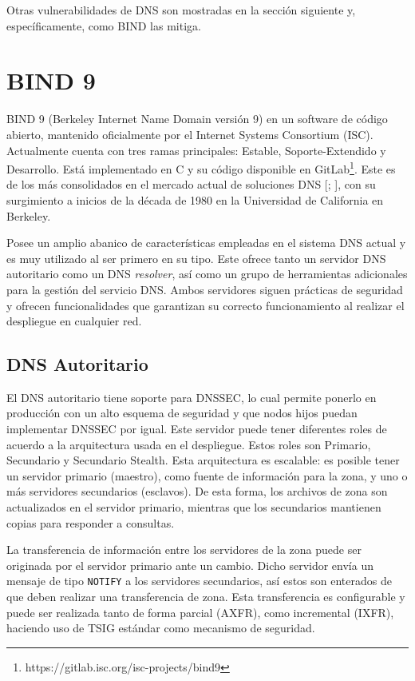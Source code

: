 Otras vulnerabilidades de DNS son mostradas en la sección siguiente y, específicamente, como BIND las mitiga.  

\section{BIND 9}

BIND 9 (Berkeley Internet Name Domain versión 9) en un software de código abierto, mantenido oficialmente por el Internet Systems Consortium (ISC). Actualmente cuenta con tres ramas principales: Estable, Soporte-Extendido y Desarrollo. Está implementado en C y su código disponible en GitLab\footnote{https://gitlab.isc.org/isc-projects/bind9}. Este es de los más consolidados en el mercado actual de soluciones DNS [\cite{dns-survey}; \cite{bind-usage}], con su surgimiento a inicios de la década de 1980 en la Universidad de California en Berkeley.

Posee un amplio abanico de características empleadas en el sistema DNS actual y es muy utilizado al ser primero en su tipo. Este ofrece tanto un servidor DNS autoritario como un DNS \textit{resolver}, así como un grupo de herramientas adicionales para la gestión del servicio DNS. Ambos servidores siguen prácticas de seguridad y ofrecen funcionalidades que garantizan su correcto funcionamiento al realizar el despliegue en cualquier red.

\subsection{DNS Autoritario}

El DNS autoritario tiene soporte para DNSSEC, lo cual permite ponerlo en producción con un alto esquema de seguridad y que nodos hijos puedan implementar DNSSEC por igual. Este servidor puede tener diferentes roles de acuerdo a la arquitectura usada en el despliegue. Estos roles son Primario, Secundario y Secundario Stealth. Esta arquitectura es escalable: es posible tener un servidor primario (maestro), como fuente de información para la zona, y uno o más servidores secundarios (esclavos). De esta forma, los archivos de zona son actualizados en el servidor primario, mientras que los secundarios mantienen copias para responder a consultas.

La transferencia de información entre los servidores de la zona puede ser originada por el servidor primario ante un cambio. Dicho servidor envía un mensaje de tipo \verb+NOTIFY+ a los servidores secundarios, así estos son enterados de que deben realizar una transferencia de zona. Esta transferencia es configurable y puede ser realizada tanto de forma parcial (AXFR), como incremental (IXFR), haciendo uso de TSIG estándar como mecanismo de seguridad.

